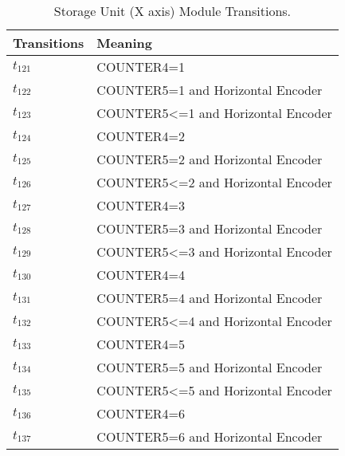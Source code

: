 \begin{table}[H]
\caption{Storage Unit (X axis) Module Transitions.}
\centering
\begin{tabular}{M{5cm}M{10cm}}
Transitions & Meaning\\
\hline
\hyperlink{partialNet:t121}{\hypertarget{partialTable:t121}{$t_{121}$}} & COUNTER4=1\\
\hyperlink{partialNet:t122}{\hypertarget{partialTable:t122}{$t_{122}$}} & COUNTER5=1 and Horizontal Encoder\\
\hyperlink{partialNet:t123}{\hypertarget{partialTable:t123}{$t_{123}$}} & COUNTER5<=1 and Horizontal Encoder\\
\hyperlink{partialNet:t124}{\hypertarget{partialTable:t124}{$t_{124}$}} & COUNTER4=2\\
\hyperlink{partialNet:t125}{\hypertarget{partialTable:t125}{$t_{125}$}} & COUNTER5=2 and Horizontal Encoder\\
\hyperlink{partialNet:t126}{\hypertarget{partialTable:t126}{$t_{126}$}} & COUNTER5<=2 and Horizontal Encoder\\
\hyperlink{partialNet:t127}{\hypertarget{partialTable:t127}{$t_{127}$}} & COUNTER4=3\\
\hyperlink{partialNet:t128}{\hypertarget{partialTable:t128}{$t_{128}$}} & COUNTER5=3 and Horizontal Encoder\\
\hyperlink{partialNet:t129}{\hypertarget{partialTable:t129}{$t_{129}$}} & COUNTER5<=3 and Horizontal Encoder\\
\hyperlink{partialNet:t130}{\hypertarget{partialTable:t130}{$t_{130}$}} & COUNTER4=4\\
\hyperlink{partialNet:t131}{\hypertarget{partialTable:t131}{$t_{131}$}} & COUNTER5=4 and Horizontal Encoder\\
\hyperlink{partialNet:t132}{\hypertarget{partialTable:t132}{$t_{132}$}} & COUNTER5<=4 and Horizontal Encoder\\
\hyperlink{partialNet:t133}{\hypertarget{partialTable:t133}{$t_{133}$}} & COUNTER4=5\\
\hyperlink{partialNet:t134}{\hypertarget{partialTable:t134}{$t_{134}$}} & COUNTER5=5 and Horizontal Encoder\\
\hyperlink{partialNet:t135}{\hypertarget{partialTable:t135}{$t_{135}$}} & COUNTER5<=5 and Horizontal Encoder\\
\hyperlink{partialNet:t136}{\hypertarget{partialTable:t136}{$t_{136}$}} & COUNTER4=6\\
\hyperlink{partialNet:t137}{\hypertarget{partialTable:t137}{$t_{137}$}} & COUNTER5=6 and Horizontal Encoder\\

\end{tabular}
\end{table}
